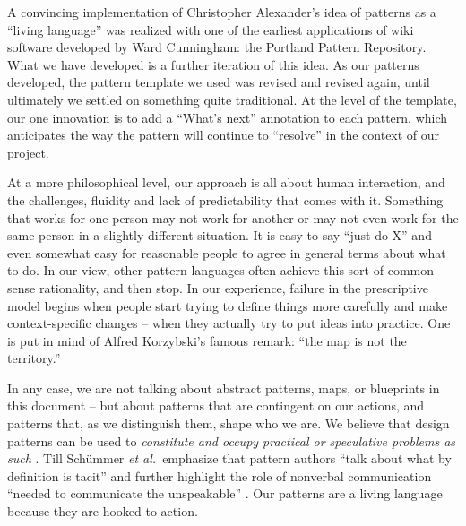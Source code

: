 A convincing implementation of Christopher Alexander’s idea of patterns as a ``living language'' \cite[p.~xvii]{alexander1977pattern} was realized with one of the earliest applications of wiki software developed by Ward Cunningham: the Portland Pattern Repository.  What we have developed is a further iteration of this idea.   As our patterns developed, the pattern template we used was revised and revised again, until ultimately we settled on something quite traditional.  At the level of the template, our one innovation is to add a ``What's next'' annotation to each pattern, which anticipates the way the pattern will continue to ``resolve'' in the context of our project. 


At a more philosophical level, our approach is all about human interaction, and the challenges, fluidity and lack of predictability that comes with it.  Something that works for one person may not work for another or may not even work for the same person in a slightly different situation.  It is easy to say ``just do X'' and even somewhat easy for reasonable people to agree in general terms about what to do.  In our view, other pattern languages often achieve this sort of common sense rationality, and then stop.  In our experience, failure in the prescriptive model begins when people start trying to define things more carefully and make context-specific changes -- when they actually try to put ideas into practice.  One is put in mind of Alfred Korzybski's famous remark: ``the map is not the territory.''  

In any case, we are not talking about abstract patterns, maps, or blueprints in this document -- but about patterns that are contingent on our actions, and patterns that, as we distinguish them, shape who we are.  We believe that design patterns can be used to \emph{constitute and occupy practical or speculative problems as such} \cite[p.~204]{deleuze1994difference}.  Till Sch{\"u}mmer \emph{et al.}~emphasize that pattern authors ``talk about what by definition is tacit'' and further highlight the role of nonverbal communication ``needed to communicate the unspeakable'' \cite[p.~9]{schummer2014beyond}.  Our patterns are a living language because they are hooked to action.

